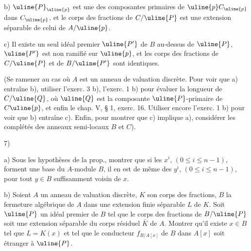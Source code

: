 b) $\uline{P}_{\uline{p}}$ est une des composantes primaires de $\uline{p}C_{\uline{p}}$ dans $C_{\uline{p}}$, et le corps des fractions de $C/\uline{P}$ est une extension séparable de celui de $A/\uline{p}$.

c) Il existe un seul idéal premier $\uline{P'}$ de $B$ au-dessus de $\uline{P}$, $\uline{P'}$ est non ramifié sur $\uline{p}$, et les corps des fractions de $C/\uline{P}$ et de $B/\uline{P'}$ sont identiques.

(Se ramener au cas où $A$ est un anneau de valuation discrète. Pour voir que a) entraîne b), utiliser l'exerc. 3 b), l'exerc. 1 b) pour évaluer la longueur de $C/\uline{Q}$, où $\uline{Q}$ est la composante $\uline{P}$-primaire de $C\uline{p}$, et enfin le chap. V, § 1, exerc. 16. Utiliser encore l'exerc. 1 b) pour voir que b) entraîne c). Enfin, pour montrer que c) implique a), considérer les complétés des anneaux semi-locaux $B$ et $C$).

7)

a) Sous les hypothèses de la prop.\quad, montrer que si les $x^i$, $(0\leq i\leq n-1)$, forment une base du $A$-module $B$, il en est de même des $y^i$, $(0\leq i\leq n-1)$, pour tout $y\in B$ suffisamment voisin de $x$.

b) Soient $A$ un anneau de valuation discrète, $K$ son corps des fractions, $B$ la fermeture algébrique de $A$ dans une extension finie séparable $L$ de $K$. Soit $\uline{P}$ un idéal premier de $B$ tel que le corps des fractions de $B/\uline{P}$ soit une extension séparable du corps résiduel $\bar K$ de $A$. Montrer qu'il existe $x\in B$ tel que $L=K(x)$ et tel que le conducteur $f_{B/A[x]}$ de $B$ dans $A[x]$ soit étranger à $\uline{P}$.

